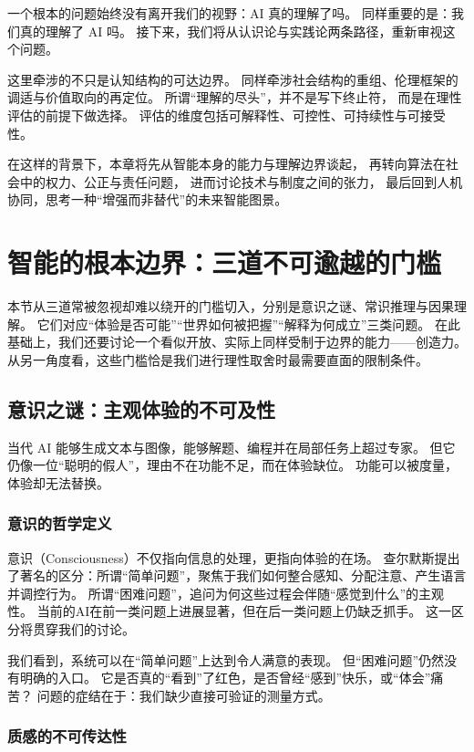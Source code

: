 一个根本的问题始终没有离开我们的视野：AI 真的理解了吗。
同样重要的是：我们真的理解了 AI 吗。
接下来，我们将从认识论与实践论两条路径，重新审视这个问题。

这里牵涉的不只是认知结构的可达边界。
同样牵涉社会结构的重组、伦理框架的调适与价值取向的再定位。
所谓“理解的尽头”，并不是写下终止符，
而是在理性评估的前提下做选择。
评估的维度包括可解释性、可控性、可持续性与可接受性。

在这样的背景下，本章将先从智能本身的能力与理解边界谈起，
再转向算法在社会中的权力、公正与责任问题，
进而讨论技术与制度之间的张力，
最后回到人机协同，思考一种“增强而非替代”的未来智能图景。

\section{智能的根本边界：三道不可逾越的门槛}

本节从三道常被忽视却难以绕开的门槛切入，分别是意识之谜、常识推理与因果理解。
它们对应“体验是否可能”“世界如何被把握”“解释为何成立”三类问题。
在此基础上，我们还要讨论一个看似开放、实际上同样受制于边界的能力——创造力。
从另一角度看，这些门槛恰是我们进行理性取舍时最需要直面的限制条件。

\subsection{意识之谜：主观体验的不可及性}

当代 AI 能够生成文本与图像，能够解题、编程并在局部任务上超过专家。
但它仍像一位“聪明的假人”，理由不在功能不足，而在体验缺位。
功能可以被度量，体验却无法替换。

\subsubsection{意识的哲学定义}

意识（Consciousness）不仅指向信息的处理，更指向体验的在场。
查尔默斯提出了著名的区分：所谓“简单问题”，聚焦于我们如何整合感知、分配注意、产生语言并调控行为。
所谓“困难问题”，追问为何这些过程会伴随“感觉到什么”的主观性。
当前的AI在前一类问题上进展显著，但在后一类问题上仍缺乏抓手。
这一区分将贯穿我们的讨论。

我们看到，系统可以在“简单问题”上达到令人满意的表现。
但“困难问题”仍然没有明确的入口。
它是否真的“看到”了红色，是否曾经“感到”快乐，或“体会”痛苦？
问题的症结在于：我们缺少直接可验证的测量方式。

\subsubsection{质感的不可传达性}

